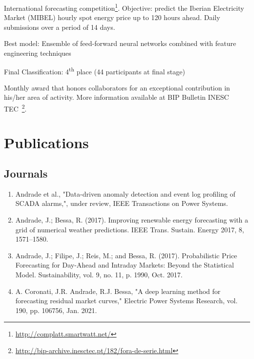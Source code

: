 \documentclass{mycv}
\begin{document}


International forecasting competition\footnote{\url{http://complatt.smartwatt.net/}}. Objective: predict the Iberian Electricity Market (MIBEL) hourly spot energy price up to 120 hours ahead. Daily submissions over a period of 14 days.


\begin{myitemize}
	\item Best model: Ensemble of feed-forward neural networks combined with feature engineering techniques
	\item Final Classification: 4\textsuperscript{th} place (44 participants at final stage)
\end{myitemize}


Monthly award that honors collaborators for an exceptional contribution in his/her area of activity. More information available at BIP Bulletin INESC TEC~\footnote{\url{http://bip-archive.inesctec.pt/182/fora-de-serie.html}}.



\pagebreak


\vspace{0.3cm}

\section{Publications}


\subsection{Journals}

\begin{enumerate}

	\item Andrade et al., "Data-driven anomaly detection and event log profiling of SCADA alarms,", under review, IEEE Transactions on Power Systems.
		
	\item Andrade, J.; Bessa, R. (2017). Improving renewable energy forecasting with a grid of
	numerical weather predictions. IEEE Trans. Sustain. Energy 2017, 8, 1571–1580.
	
	\item Andrade, J.; Filipe, J.; Reis, M.; and Bessa, R. (2017). Probabilistic Price Forecasting for Day-Ahead and Intraday Markets: Beyond the Statistical Model. Sustainability, vol. 9, no. 11, p. 1990, Oct. 2017.
	
	\item A. Coronati, J.R. Andrade, R.J. Bessa, "A deep learning method for forecasting residual market curves," Electric Power Systems Research, vol. 190, pp. 106756, Jan. 2021.
	
\end{enumerate}
\end{document}
